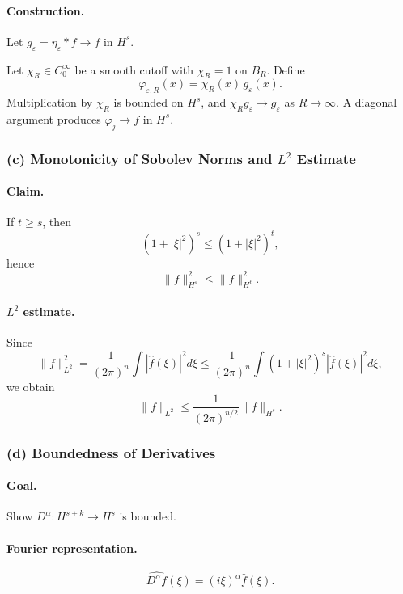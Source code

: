 \documentclass[12pt,a4paper]{article}
\theoremstyle{plain}
\theoremstyle{definition}
\theoremstyle{remark}
\theoremstyle{remark}
\begin{document}
\paragraph{\textbf{Construction.}}
Let $g_\varepsilon = \eta_\varepsilon * f \to f$ in $H^s$.

Let $\chi_R\in C_0^\infty$ be a smooth cutoff with $\chi_R=1$ on $B_R$.
Define
\[
\varphi_{\varepsilon,R}(x)= \chi_R(x)\, g_\varepsilon(x).
\]
Multiplication by $\chi_R$ is bounded on $H^s$, and 
$\chi_R g_\varepsilon \to g_\varepsilon$ as $R\to\infty$.
A diagonal argument produces $\varphi_j\to f$ in $H^s$.

\subsubsection*{(c) \; Monotonicity of Sobolev Norms and $L^2$ Estimate}

\paragraph{\textbf{Claim.}}
If $t\ge s$, then 
\[
(1+|\xi|^2)^s \le (1+|\xi|^2)^t,
\]
hence
\[
\|f\|_{H^s}^2 \le \|f\|_{H^t}^2.
\]

\paragraph{\textbf{$L^2$ estimate.}}
Since
\[
\|f\|_{L^2}^2 
= \frac{1}{(2\pi)^n}\int |\widehat{f}(\xi)|^2 d\xi
\le \frac{1}{(2\pi)^n} \int (1+|\xi|^2)^s |\widehat{f}(\xi)|^2 d\xi,
\]
we obtain
\[
\|f\|_{L^2} \le \frac{1}{(2\pi)^{n/2}} \|f\|_{H^s}.
\]

\subsubsection*{(d) \; Boundedness of Derivatives}

\paragraph{\textbf{Goal.}}  
Show $D^\alpha : H^{s+k} \to H^{s}$ is bounded.

\paragraph{\textbf{Fourier representation.}}
\[
\widehat{D^\alpha f}(\xi) = (i\xi)^\alpha \widehat{f}(\xi).
\]
\end{document}
